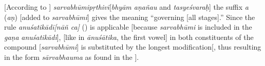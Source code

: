 [According to ]%
 \emph{sarvabhūmipṛthivī}[\emph{bhyām aṇañau} and \emph{tasyeśvaraḥ}] the suffix \emph{a} (\emph{aṇ}) [added to \emph{sarvabhūmi}] gives the meaning ``governing [all stages].''  Since the rule \emph{anuśatikādī\emph{[}nāñ ca\emph{]}} () is applicable [because \emph{sarvabhūmi} is included in the \emph{gaṇa} \emph{anuśatikādi}], [like in \emph{ānuśātika}, the first vowel] in both constituents of the compound [\emph{sarvabhūmi}] is substituted by the longest modification[, thus resulting in the form \emph{sārvabhauma} as found in the \bhasya].


